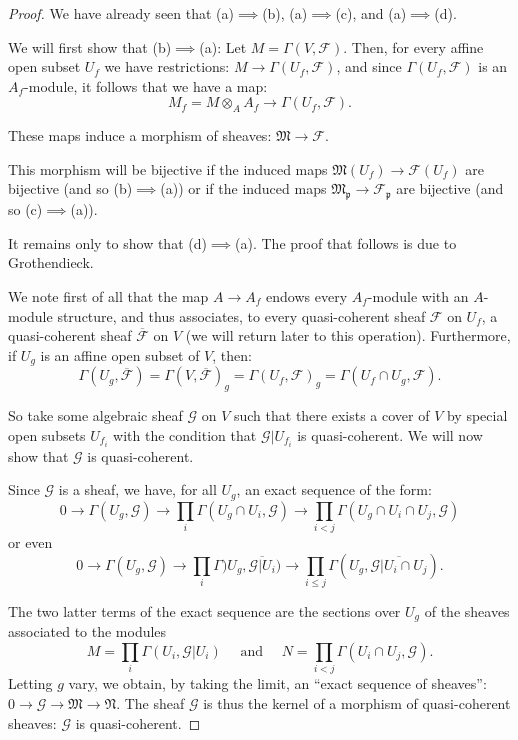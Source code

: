 \documentclass[british]{article}
\newcommand{\oldpage}[1]{\marginpar{\footnotesize$\Big\vert$ \textit{p.~#1}}}
\begin{document}
\begin{proof}
We have already seen that (a)\(\implies\)(b), (a)\(\implies\)(c), and
(a)\(\implies\)(d).

We will first show that (b)\(\implies\)(a): Let
\(M=\Gamma(V,{\mathscr{F}})\). Then, for every affine open subset
\(U_f\) we have restrictions: \(M\to\Gamma(U_f,{\mathscr{F}})\), and
since \(\Gamma(U_f,{\mathscr{F}})\) is an \(A_f\)-module, it follows
that we have a map: \[
  M_f = M\otimes_A A_f \to \Gamma(U_f,{\mathscr{F}}).
\] \oldpage{1-08}

These maps induce a morphism of sheaves:
\(\mathfrak{M}\to{\mathscr{F}}\).

This morphism will be bijective if the induced maps
\(\mathfrak{M}(U_f)\to{\mathscr{F}}(U_f)\) are bijective (and so
(b)\(\implies\)(a)) or if the induced maps
\(\mathfrak{M}_\mathfrak{p}\to{\mathscr{F}}_\mathfrak{p}\) are bijective
(and so (c)\(\implies\)(a)).

It remains only to show that (d)\(\implies\)(a). The proof that follows
is due to Grothendieck.

We note first of all that the map \(A\to A_f\) endows every
\(A_f\)-module with an \(A\)-module structure, and thus associates, to
every quasi-coherent sheaf \({\mathscr{F}}\) on \(U_f\), a
quasi-coherent sheaf \(\overline{{\mathscr{F}}}\) on \(V\) (we will
return later to this operation). Furthermore, if \(U_g\) is an affine
open subset of \(V\), then: \[
  \Gamma(U_g,\overline{{\mathscr{F}}})
  = \Gamma(V,\overline{{\mathscr{F}}})_g
  = \Gamma(U_f,{\mathscr{F}})_g
  = \Gamma(U_f\cap U_g,{\mathscr{F}}).
\]

So take some algebraic sheaf \({\mathscr{G}}\) on \(V\) such that there
exists a cover of \(V\) by special open subsets \(U_{f_i}\) with the
condition that \({\mathscr{G}}|U_{f_i}\) is quasi-coherent. We will now
show that \({\mathscr{G}}\) is quasi-coherent.

Since \({\mathscr{G}}\) is a sheaf, we have, for all \(U_g\), an exact
sequence of the form: \[
  0
  \to \Gamma(U_g,{\mathscr{G}})
  \to \prod_i \Gamma(U_g\cap U_i,{\mathscr{G}})
  \to \prod_{i<j} \Gamma(U_g\cap U_i\cap U_j,{\mathscr{G}})
\] or even \[
  0
  \to \Gamma(U_g,{\mathscr{G}})
  \to \prod_i \Gamma)U_g,\overline{{\mathscr{G}}|U_i})
  \to \prod_{i\leqslant j} \Gamma(U_g,\overline{{\mathscr{G}}|U_i\cap U_j}).
\]

The two latter terms of the exact sequence are the sections over \(U_g\)
of the sheaves associated to the modules \[
  M = \prod_i \Gamma(U_i,{\mathscr{G}}|U_i)
  \quad\text{ and }\quad
  N = \prod_{i<j} \Gamma(U_i\cap U_j,{\mathscr{G}}).
\] Letting \(g\) vary, we obtain, by taking the limit, an ``exact
sequence of sheaves'':
\(0\to{\mathscr{G}}\to\mathfrak{M}\to\mathfrak{N}\). The sheaf
\({\mathscr{G}}\) is thus the kernel of a morphism of quasi-coherent
sheaves: \({\mathscr{G}}\) is quasi-coherent.
\end{proof}
\end{document}
